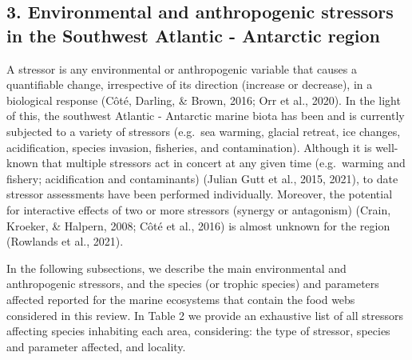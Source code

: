 \documentclass[
]{article}
\begin{document}
\normalsize

\hypertarget{environmental-and-anthropogenic-stressors-in-the-southwest-atlantic---antarctic-region}{%
\subsection{3. Environmental and anthropogenic stressors in the
Southwest Atlantic - Antarctic
region}\label{environmental-and-anthropogenic-stressors-in-the-southwest-atlantic---antarctic-region}}

A stressor is any environmental or anthropogenic variable that causes a
quantifiable change, irrespective of its direction (increase or
decrease), in a biological response (Côté, Darling, \& Brown, 2016; Orr
et al., 2020). In the light of this, the southwest Atlantic - Antarctic
marine biota has been and is currently subjected to a variety of
stressors (e.g.~sea warming, glacial retreat, ice changes,
acidification, species invasion, fisheries, and contamination). Although
it is well-known that multiple stressors act in concert at any given
time (e.g.~warming and fishery; acidification and contaminants) (Julian
Gutt et al., 2015, 2021), to date stressor assessments have been
performed individually. Moreover, the potential for interactive effects
of two or more stressors (synergy or antagonism) (Crain, Kroeker, \&
Halpern, 2008; Côté et al., 2016) is almost unknown for the region
(Rowlands et al., 2021).

In the following subsections, we describe the main environmental and
anthropogenic stressors, and the species (or trophic species) and
parameters affected reported for the marine ecosystems that contain the
food webs considered in this review. In Table 2 we provide an exhaustive
list of all stressors affecting species inhabiting each area,
considering: the type of stressor, species and parameter affected, and
locality.
\end{document}
